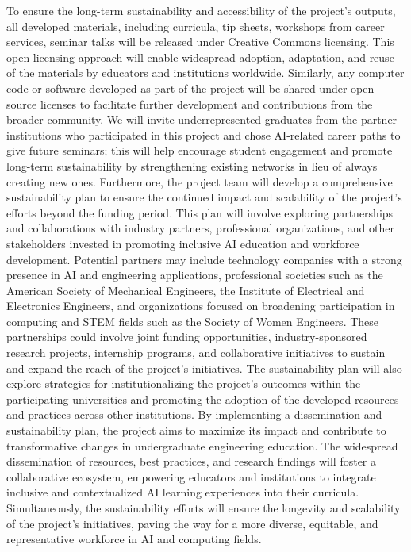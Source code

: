 \documentclass[11pt]{article}
\begin{document}
To ensure the long-term sustainability and accessibility of the project's outputs, all developed materials, including curricula, tip sheets, workshops from career services, seminar talks will be released under Creative Commons licensing. 
This open licensing approach will enable widespread adoption, adaptation, and reuse of the materials by educators and institutions worldwide. 
Similarly, any computer code or software developed as part of the project will be shared under open-source licenses to facilitate further development and contributions from the broader community.
We will invite underrepresented graduates from the partner institutions who participated in this project and chose AI-related career paths to give future seminars; this will help encourage student engagement and promote long-term sustainability by strengthening existing networks in lieu of always creating new ones.
Furthermore, the project team will develop a comprehensive sustainability plan to ensure the continued impact and scalability of the project's efforts beyond the funding period. 
This plan will involve exploring partnerships and collaborations with industry partners, professional organizations, and other stakeholders invested in promoting inclusive AI education and workforce development.
Potential partners may include technology companies with a strong presence in AI and engineering applications, professional societies such as the American Society of Mechanical Engineers, the Institute of Electrical and Electronics Engineers, and organizations focused on broadening participation in computing and STEM fields such as the Society of Women Engineers. These partnerships could involve joint funding opportunities, industry-sponsored research projects, internship programs, and collaborative initiatives to sustain and expand the reach of the project's initiatives.
The sustainability plan will also explore strategies for institutionalizing the project's outcomes within the participating universities and promoting the adoption of the developed resources and practices across other institutions. 
By implementing a dissemination and sustainability plan, the project aims to maximize its impact and contribute to transformative changes in undergraduate engineering education. 
The widespread dissemination of resources, best practices, and research findings will foster a collaborative ecosystem, empowering educators and institutions to integrate inclusive and contextualized AI learning experiences into their curricula. 
Simultaneously, the sustainability efforts will ensure the longevity and scalability of the project's initiatives, paving the way for a more diverse, equitable, and representative workforce in AI and computing fields.
\end{document}
